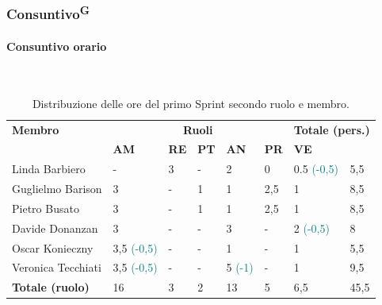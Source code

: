 \documentclass[8pt]{article}
\newcommand{\glossterm}[1]{#1\textsuperscript{G}} %
\newcommand{\subsubsubsection}[1]{\paragraph{#1}\mbox{}\\}
\begin{document}
\subsubsection{\glossterm{Consuntivo}}
\subsubsubsection{Consuntivo orario}
\begin{table}[ht!]
	\centering
	\begin{tabular}{p{3cm} p{1.5cm} p{1.5cm} p{1.5cm} p{1.5cm} p{1.5cm} p{1.5cm} p{1cm}}
		\toprule
        \textbf{Membro} & \multicolumn{5}{c}{\textbf{Ruoli}} & \multicolumn{2}{r}{\textbf{Totale
        (pers.)}}\\
		& \textbf{AM} & \textbf{RE} & \textbf{PT} & \textbf{AN} & \textbf{PR} & \textbf{VE}\\
		\midrule
        Linda Barbiero          & -     & 3     & -     & 2     & 0     & 0.5 \textcolor{teal}{(-0,5)}   & 5,5 \\
        Guglielmo Barison       & 3     & -     & 1     & 1     & 2,5   & 1     & 8,5\\
        Pietro Busato           & 3     & -     & 1     & 1     & 2,5   & 1     & 8,5 \\
        Davide Donanzan         & 3     & -     & -     & 3     & -     & 2 \textcolor{teal}{(-0,5)}     & 8 \\
        Oscar Konieczny         & 3,5 \textcolor{teal}{(-0,5)}  & -     & -     & 1     & -     & 1     & 5,5 \\
        Veronica Tecchiati      & 3,5 \textcolor{teal}{(-0,5)}  & -     & -     & 5 \textcolor{teal}{(-1)}    & -     & 1     & 9,5 \\
        \bottomrule
        \textbf{Totale (ruolo)} & 16    & 3     & 2     & 13   & 5     & 6,5   & 45,5 \\
	\end{tabular}
	\caption{Distribuzione delle ore del primo Sprint secondo ruolo e membro.}
	\label{table:Distribuzione delle ore consuntive del primo Sprint secondo ruolo e membro}
\end{table}
\end{document}
